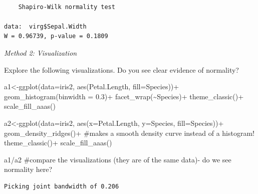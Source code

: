 \documentclass[
  letterpaper,
  DIV=11,
  numbers=noendperiod]{scrartcl}
\newenvironment{Shaded}{\begin{snugshade}}{\end{snugshade}}
\newcommand{\AttributeTok}[1]{\textcolor[rgb]{0.40,0.45,0.13}{#1}}
\newcommand{\CommentTok}[1]{\textcolor[rgb]{0.37,0.37,0.37}{#1}}
\newcommand{\FloatTok}[1]{\textcolor[rgb]{0.68,0.00,0.00}{#1}}
\newcommand{\FunctionTok}[1]{\textcolor[rgb]{0.28,0.35,0.67}{#1}}
\newcommand{\NormalTok}[1]{\textcolor[rgb]{0.00,0.23,0.31}{#1}}
\newcommand{\OtherTok}[1]{\textcolor[rgb]{0.00,0.23,0.31}{#1}}
\newcommand{\SpecialCharTok}[1]{\textcolor[rgb]{0.37,0.37,0.37}{#1}}
\begin{document}
\begin{verbatim}

    Shapiro-Wilk normality test

data:  virg$Sepal.Width
W = 0.96739, p-value = 0.1809
\end{verbatim}

\hfill\break
\emph{Method 2: Visualization}

Explore the following visualizations. Do you see clear evidence of
normality?

\begin{Shaded}
\begin{Highlighting}[]
\NormalTok{a1}\OtherTok{\textless{}{-}}\FunctionTok{ggplot}\NormalTok{(}\AttributeTok{data=}\NormalTok{iris2, }\FunctionTok{aes}\NormalTok{(Petal.Length, }\AttributeTok{fill=}\NormalTok{Species))}\SpecialCharTok{+}
  \FunctionTok{geom\_histogram}\NormalTok{(}\AttributeTok{binwidth =} \FloatTok{0.3}\NormalTok{)}\SpecialCharTok{+} 
  \FunctionTok{facet\_wrap}\NormalTok{(}\SpecialCharTok{\textasciitilde{}}\NormalTok{Species)}\SpecialCharTok{+}
  \FunctionTok{theme\_classic}\NormalTok{()}\SpecialCharTok{+}
  \FunctionTok{scale\_fill\_aaas}\NormalTok{()}

\NormalTok{a2}\OtherTok{\textless{}{-}}\FunctionTok{ggplot}\NormalTok{(}\AttributeTok{data=}\NormalTok{iris2, }\FunctionTok{aes}\NormalTok{(}\AttributeTok{x=}\NormalTok{Petal.Length, }\AttributeTok{y=}\NormalTok{Species, }\AttributeTok{fill=}\NormalTok{Species))}\SpecialCharTok{+}
  \FunctionTok{geom\_density\_ridges}\NormalTok{()}\SpecialCharTok{+} \CommentTok{\#makes a smooth density curve instead of a histogram!}
  \FunctionTok{theme\_classic}\NormalTok{()}\SpecialCharTok{+}
  \FunctionTok{scale\_fill\_aaas}\NormalTok{()}

\NormalTok{a1}\SpecialCharTok{/}\NormalTok{a2 }\CommentTok{\#compare the visualizations (they are of the same data){-} do we see normality here?}
\end{Highlighting}
\end{Shaded}

\begin{verbatim}
Picking joint bandwidth of 0.206
\end{verbatim}
\end{document}
